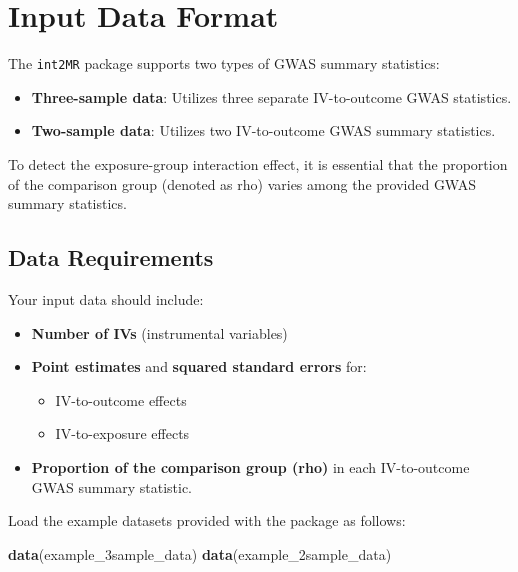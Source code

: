 \documentclass[
]{article}
\newenvironment{Shaded}{\begin{snugshade}}{\end{snugshade}}
\newcommand{\FunctionTok}[1]{\textcolor[rgb]{0.13,0.29,0.53}{\textbf{#1}}}
\newcommand{\NormalTok}[1]{#1}
\providecommand{\tightlist}{%
  \setlength{\itemsep}{0pt}\setlength{\parskip}{0pt}}
\begin{document}
\section{Input Data Format}\label{input-data-format}

The \texttt{int2MR} package supports two types of GWAS summary
statistics:

\begin{itemize}
\tightlist
\item
  \textbf{Three-sample data}: Utilizes three separate IV-to-outcome GWAS
  statistics.
\item
  \textbf{Two-sample data}: Utilizes two IV-to-outcome GWAS summary
  statistics.
\end{itemize}

To detect the exposure-group interaction effect, it is essential that
the proportion of the comparison group (denoted as rho) varies among the
provided GWAS summary statistics.

\subsection{Data Requirements}\label{data-requirements}

Your input data should include:

\begin{itemize}
\tightlist
\item
  \textbf{Number of IVs} (instrumental variables)
\item
  \textbf{Point estimates} and \textbf{squared standard errors} for:

  \begin{itemize}
  \tightlist
  \item
    IV-to-outcome effects
  \item
    IV-to-exposure effects
  \end{itemize}
\item
  \textbf{Proportion of the comparison group (rho)} in each
  IV-to-outcome GWAS summary statistic.
\end{itemize}

Load the example datasets provided with the package as follows:

\begin{Shaded}
\begin{Highlighting}[]
\FunctionTok{data}\NormalTok{(example\_3sample\_data)}
\FunctionTok{data}\NormalTok{(example\_2sample\_data)}
\end{Highlighting}
\end{Shaded}
\end{document}
